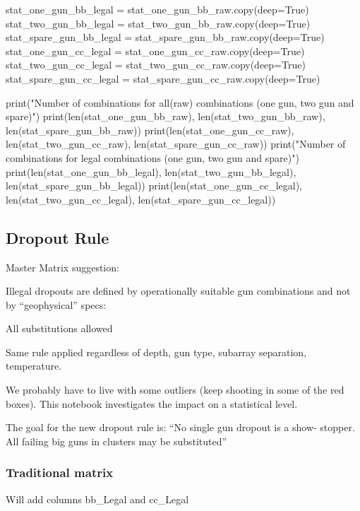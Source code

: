 \documentclass[11pt]{article}
\begin{document}
    stat\_one\_gun\_bb\_legal = stat\_one\_gun\_bb\_raw.copy(deep=True)
stat\_two\_gun\_bb\_legal = stat\_two\_gun\_bb\_raw.copy(deep=True)
stat\_spare\_gun\_bb\_legal = stat\_spare\_gun\_bb\_raw.copy(deep=True)
stat\_one\_gun\_cc\_legal = stat\_one\_gun\_cc\_raw.copy(deep=True)
stat\_two\_gun\_cc\_legal = stat\_two\_gun\_cc\_raw.copy(deep=True)
stat\_spare\_gun\_cc\_legal = stat\_spare\_gun\_cc\_raw.copy(deep=True)

    print("Number of combinations for all(raw) combinations (one gun, two
gun and spare)") print(len(stat\_one\_gun\_bb\_raw),
len(stat\_two\_gun\_bb\_raw), len(stat\_spare\_gun\_bb\_raw))
print(len(stat\_one\_gun\_cc\_raw), len(stat\_two\_gun\_cc\_raw),
len(stat\_spare\_gun\_cc\_raw)) print("Number of combinations for legal
combinations (one gun, two gun and spare)")
print(len(stat\_one\_gun\_bb\_legal), len(stat\_two\_gun\_bb\_legal),
len(stat\_spare\_gun\_bb\_legal)) print(len(stat\_one\_gun\_cc\_legal),
len(stat\_two\_gun\_cc\_legal), len(stat\_spare\_gun\_cc\_legal))

    \subsection{Dropout Rule}\label{dropout-rule}

Master Matrix suggestion:

Illegal dropouts are defined by operationally suitable gun combinations
and not by ``geophysical'' specs:

All substitutions allowed

Same rule applied regardless of depth, gun type, subarray separation,
temperature.

We probably have to live with some outliers (keep shooting in some of
the red boxes). This notebook investigates the impact on a statistical
level.

The goal for the new dropout rule is: ``No single gun dropout is a show-
stopper. All failing big guns in clusters may be substituted''

    \subsubsection{Traditional matrix}\label{traditional-matrix}

    Will add columns bb\_Legal and cc\_Legal
\end{document}
